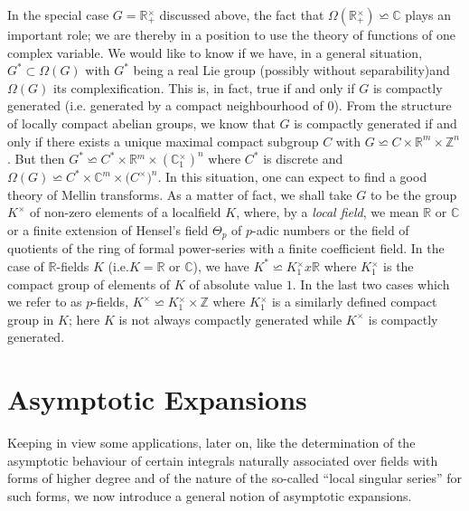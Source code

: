 In the special case $G=\mathbb{R}{_+^\times}$ discussed above, the fact
that $\Omega(\mathbb{R}{_+^\times})\backsimeq \mathbb{C}$ plays an
important role; we are thereby in a position to use the theory of
functions of one complex variable. We would like to know if we have,
in a general situation, $G^{\ast}\subset\Omega(G)$ with $G^{\ast}$
being a real Lie group (possibly without separability)and $\Omega(G)$
its complexification. This is, in fact, true if and only if $G$ is
compactly generated (i.e. generated by a compact neighbourhood
of $0$). From the structure of locally compact abelian groups, we know
that $G$ is compactly generated if and only if there exists a unique
maximal compact subgroup $C$ with $G\backsimeq
C\times\mathbb{R}^{m}\times\mathbb{Z}^{n}$. But then $G^{\ast}\backsimeq
C^{\ast}\times\mathbb{R}{^m}\times(\mathbb{C}{_1^\times})^{n}$ where $C^{\ast}$ is
discrete and $\Omega(G)\backsimeq
C^{\ast}\times \mathbb{C}^{m}\times\mathbb({C}^\times)^{n}$. In this situation, one
can expect to find a good theory of Mellin transforms. As a matter of
fact, we shall take $G$ to be the group $K^\times$ of non-zero elements of
a local\pageoriginale field $K$, where, by a {\em local field}, we mean $\mathbb{R}$
or $\mathbb{C}$ or a finite extension of Hensel's field $\Theta_p$ of
$p$-adic numbers or the field of quotients of the ring of formal
power-series with a finite coefficient field. In the case of
$\mathbb{R}$-fields $K$ (i.e.$K=\mathbb{R}$ or $\mathbb{C}$), we have
$K^{*}\backsimeq K{_1^\times}x\mathbb{R}$ where $K{_1^\times}$ is the compact
group of elements of $K$ of absolute value $1$. In the last two cases
which we refer to as $p$-fields, $K^\times\backsimeq K{_1^\times}\times \mathbb{Z}$
where $K{_1^\times}$ is a similarly defined compact group in $K$; here $K$ is
not always compactly generated while $K^\times$ is compactly generated.

\section{Asymptotic Expansions}\label{chap1:sec2}

Keeping in view some applications, later on, like the determination of
the asymptotic behaviour of certain integrals naturally associated
over fields with forms of higher degree and of the nature of the
so-called ``local singular series'' for such forms, we now introduce a
general notion of asymptotic expansions.

